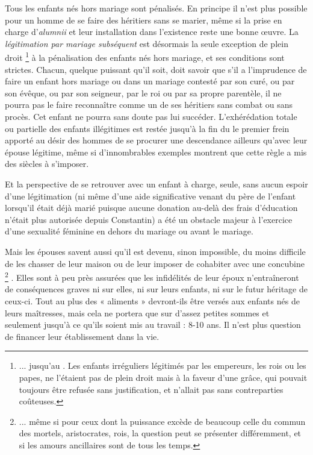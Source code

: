  Tous les enfants nés hors mariage sont pénalisés. En principe il n'est plus possible pour un homme de se faire des héritiers sans se marier, même si la prise en charge d'\emph{alumnii} et leur installation dans l'existence reste une bonne œuvre. La \emph{légitimation par mariage subséquent} est désormais la seule exception de plein droit%
\footnote{... jusqu'au . Les enfants irréguliers légitimés par les empereurs, les rois ou les papes, ne l'étaient pas de plein droit mais à la faveur d'une grâce, qui pouvait toujours être refusée sans justification, et n'allait pas sans contreparties coûteuses.} 
à la pénalisation des enfants nés hors mariage, et ses conditions sont strictes. Chacun, quelque puissant qu'il soit, doit savoir que s'il a l'imprudence de faire un enfant hors mariage ou dans un mariage contesté par son curé, ou par son évêque, ou par son seigneur, par le roi ou par sa propre parentèle, il ne pourra pas le faire reconnaître comme un de ses héritiers sans combat ou sans procès. Cet enfant ne pourra sans doute pas lui succéder. L'exhérédation totale ou partielle des enfants illégitimes est restée jusqu'à la fin du  le premier frein apporté au désir des hommes de se procurer une descendance ailleurs qu'avec leur épouse légitime, même si d'innombrables exemples montrent que cette règle a mis des siècles à s'imposer.

 Et la perspective de se retrouver avec un enfant à charge, seule, sans aucun espoir d'une légitimation (ni même d'une aide significative venant du père de l'enfant lorsqu'il était déjà marié puisque aucune donation au-delà des frais d'éducation n'était plus autorisée depuis Constantin) a été un obstacle majeur à l'exercice d'une sexualité féminine en dehors du mariage ou avant le mariage. 

 Mais les épouses savent aussi qu'il est devenu, sinon impossible, du moins difficile de les chasser de leur maison ou de leur imposer de cohabiter avec une concubine%
\footnote{... même si pour ceux dont la puissance excède de beaucoup celle du commun des mortels, aristocrates, rois, la question peut se présenter différemment, et si les amours ancillaires sont de tous les temps.}%
. Elles sont à peu près assurées que les infidélités de leur époux n'entraîneront de conséquences graves ni sur elles, ni sur leurs enfants, ni sur le futur héritage de ceux-ci. Tout au plus des « aliments » devront-ils être versés aux enfants nés de leurs maîtresses, mais cela ne portera que sur d'assez petites sommes et seulement jusqu'à ce qu'ils soient mis au travail : 8-10 ans. Il n'est plus question de financer leur établissement dans la vie. 

